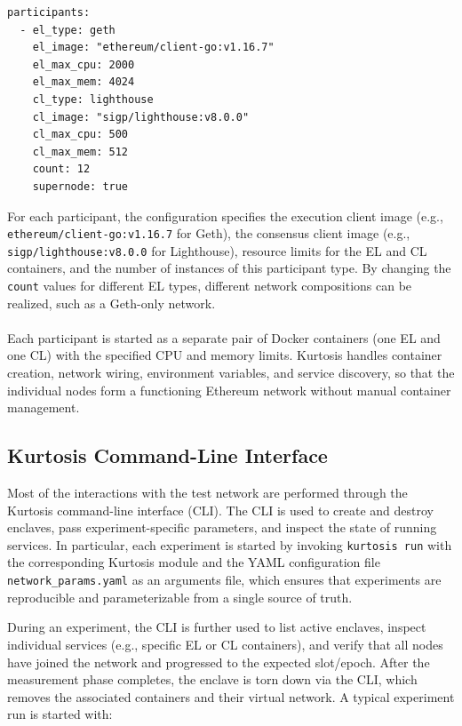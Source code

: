 \begin{lstlisting}[caption={Kurtosis participant configuration for 12 Geth + Lighthouse nodes},label={lst:participants-config}]
participants:
  - el_type: geth
    el_image: "ethereum/client-go:v1.16.7"
    el_max_cpu: 2000
    el_max_mem: 4024
    cl_type: lighthouse
    cl_image: "sigp/lighthouse:v8.0.0"
    cl_max_cpu: 500
    cl_max_mem: 512
    count: 12
    supernode: true
\end{lstlisting}

For each participant, the configuration specifies the execution client image (e.g., \texttt{ethereum/client-go:v1.16.7} for Geth), the consensus client image (e.g., \texttt{sigp/lighthouse:v8.0.0} for Lighthouse), resource limits for the EL and CL containers, and the number of instances of this participant type. By changing the \texttt{count} values for different EL types, different network compositions can be realized, such as a Geth-only network.
\\
\\
Each participant is started as a separate pair of Docker containers (one EL and one CL) with the specified CPU and memory limits. Kurtosis handles container creation, network wiring, environment variables, and service discovery, so that the individual nodes form a functioning Ethereum network without manual container management.

\subsection{Kurtosis Command-Line Interface}

Most of the interactions with the test network are performed through the Kurtosis command-line interface (CLI). The CLI is used to create and destroy enclaves, pass experiment-specific parameters, and inspect the state of running services. In particular, each experiment is started by invoking \texttt{kurtosis run} with the corresponding Kurtosis module and the YAML configuration file \texttt{network\_params.yaml} as an arguments file, which ensures that experiments are reproducible and parameterizable from a single source of truth.

During an experiment, the CLI is further used to list active enclaves, inspect individual services (e.g., specific EL or CL containers), and verify that all nodes have joined the network and progressed to the expected slot/epoch. After the measurement phase completes, the enclave is torn down via the CLI, which removes the associated containers and their virtual network. A typical experiment run is started with:

